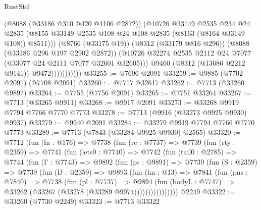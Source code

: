 \begin{lexlean}{RustStd}
\begin{coremodule}
                              (@8088 (@33186 @310 @420 @4106 @2872))
                              (@10726
                                @33149
                                @2535
                                @234
                                @24
                                @2835
                                (@8155
                                  @33149
                                  @2535
                                  @108
                                  @24
                                  @108
                                  @2835
                                  (@8163 (@8164 @33149 @108))
                                  @8511)))
                            (@8766 (@33175 @19))
                            (@8312 (@33179 @816 @296))
                            (@8088 (@33186 @296 @197 @2902 @2872))
                            (@10726
                              @32274
                              @2535
                              @2112
                              @24
                              @7077
                              (@33077 @24 @2111 @7077 @32601 @32605)))
                          @9460
                          (@8312 (@13686 @2212 @9141))
                          @9472)))))))))))
@33255 := @7696 @2091
@33259 := @9885 (@7702 @2091) (@7708 @2091)
@33260 := @7717 @32617
@33262 := @7713 (@33260 @9897)
@33264 := @7755 (@7756 @2091)
@33265 := @7751 @33264
@33267 := @7713 (@33265 @9911)
@33268 := @9917 @2091
@33273 := @33268 @9919 @7794 @7766 @7770 @7773
@33278 := @7713 (@9916 (@33273 @9925 @9930) @9937)
@33279 := @9940 @2091
@33284 := @33279 @9919 @7794 @7766 @7770 @7773
@33289 := @7713 (@7843 (@33284 @9925 @9930) @2565)
@33320 := @7712
    (fun (fn : @176) =>
    @7738
      (fun (rc : @7737) =>
      @7739
        (fun (rty : @2359) =>
        @7741
          (fun (lets0 : @7740) =>
          @7742
            (fun (tail0 : @2785) =>
            @7744
              (fun (Γ : @7743) =>
              @9892
                (fun (ps : @9891) =>
                @7739
                  (fun (S : @2359) =>
                  @7739
                    (fun (D : @2359) =>
                    @9893
                      (fun (hn : @13) =>
                      @7841
                        (fun (pns : @7840) =>
                        @7738
                          (fun (pl : @7737) =>
                          @9894
                            (fun (bodyL : @7747) =>
                            @33262 (@33267 (@33278 (@33289 @9974))))))))))))))))
    @2249
@33322 := @33260 (@7730 @2249)
@33323 := @7713 @33322

\end{coremodule}
\end{lexlean}
